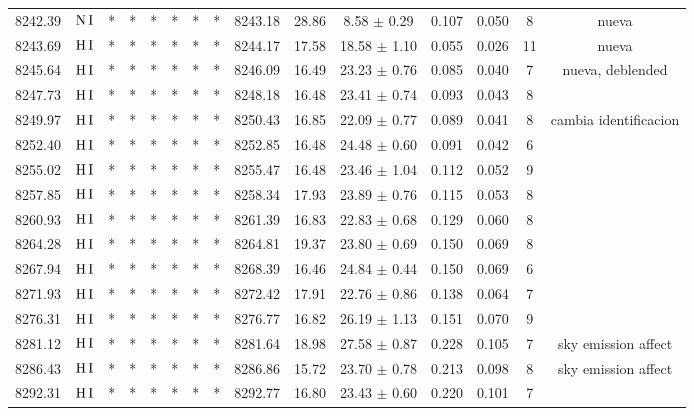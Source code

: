 \documentclass{article}
\begin{document}
\begin{table*}
\begin{adjustbox}{width=\textwidth}
\begin{tabular}{ccccccccccccccc}
8242.39 & $\mbox{N}\thinspace \mbox{I}$ & * & * & * & * & * & * & 8243.18 & 28.86 & 8.58 $\pm$ 0.29 & 0.107 & 0.050 & 8 &  nueva \\
8243.69 & $\mbox{H}\thinspace \mbox{I}$ & * & * & * & * & * & * & 8244.17 & 17.58 & 18.58 $\pm$ 1.10 & 0.055 & 0.026 & 11 &  nueva \\
8245.64 & $\mbox{H}\thinspace \mbox{I}$ & * & * & * & * & * & * & 8246.09 & 16.49 & 23.23 $\pm$ 0.76 & 0.085 & 0.040 & 7 &  nueva, deblended \\
8247.73 & $\mbox{H}\thinspace \mbox{I}$ & * & * & * & * & * & * & 8248.18 & 16.48 & 23.41 $\pm$ 0.74 & 0.093 & 0.043 & 8 &  \\
8249.97 & $\mbox{H}\thinspace \mbox{I}$ & * & * & * & * & * & * & 8250.43 & 16.85 & 22.09 $\pm$ 0.77 & 0.089 & 0.041 & 8 &  cambia identificacion \\
8252.40 & $\mbox{H}\thinspace \mbox{I}$ & * & * & * & * & * & * & 8252.85 & 16.48 & 24.48 $\pm$ 0.60 & 0.091 & 0.042 & 6 &  \\
8255.02 & $\mbox{H}\thinspace \mbox{I}$ & * & * & * & * & * & * & 8255.47 & 16.48 & 23.46 $\pm$ 1.04 & 0.112 & 0.052 & 9 &  \\
8257.85 & $\mbox{H}\thinspace \mbox{I}$ & * & * & * & * & * & * & 8258.34 & 17.93 & 23.89 $\pm$ 0.76 & 0.115 & 0.053 & 8 &  \\
8260.93 & $\mbox{H}\thinspace \mbox{I}$ & * & * & * & * & * & * & 8261.39 & 16.83 & 22.83 $\pm$ 0.68 & 0.129 & 0.060 & 8 &  \\
8264.28 & $\mbox{H}\thinspace \mbox{I}$ & * & * & * & * & * & * & 8264.81 & 19.37 & 23.80 $\pm$ 0.69 & 0.150 & 0.069 & 8 &  \\
8267.94 & $\mbox{H}\thinspace \mbox{I}$ & * & * & * & * & * & * & 8268.39 & 16.46 & 24.84 $\pm$ 0.44 & 0.150 & 0.069 & 6 &  \\
8271.93 & $\mbox{H}\thinspace \mbox{I}$ & * & * & * & * & * & * & 8272.42 & 17.91 & 22.76 $\pm$ 0.86 & 0.138 & 0.064 & 7 &  \\
8276.31 & $\mbox{H}\thinspace \mbox{I}$ & * & * & * & * & * & * & 8276.77 & 16.82 & 26.19 $\pm$ 1.13 & 0.151 & 0.070 & 9 &  \\
8281.12 & $\mbox{H}\thinspace \mbox{I}$ & * & * & * & * & * & * & 8281.64 & 18.98 & 27.58 $\pm$ 0.87 & 0.228 & 0.105 & 7 &  sky emission affect \\
8286.43 & $\mbox{H}\thinspace \mbox{I}$ & * & * & * & * & * & * & 8286.86 & 15.72 & 23.70 $\pm$ 0.78 & 0.213 & 0.098 & 8 &  sky emission affect \\
8292.31 & $\mbox{H}\thinspace \mbox{I}$ & * & * & * & * & * & * & 8292.77 & 16.80 & 23.43 $\pm$ 0.60 & 0.220 & 0.101 & 7 &  \\

\end{tabular}
\end{adjustbox}
\end{table*}
\end{document}
